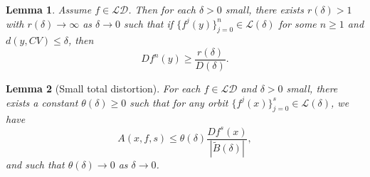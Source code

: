 \documentclass[11pt,oneside]{article}
\theoremstyle{plain}
\newtheorem{lem}{Lemma}[section]
\numberwithin{equation}{section}
\numberwithin{figure}{section}
\numberwithin{table}{section}
\begin{document}
\iffalse
\begin{lem}
Assume $f \in \mathcal {LD}$. Then for each $\delta >0$ small, there exists $r(\delta) > 1$ with $r(\delta) \to \infty$ as $\delta \to 0$ such that if $\{f^j(y) \}_{j=0}^n \in \mathcal L(\delta)$ for some $n \geq 1$ and $d (y, CV) \leq \delta$, then 
\[
Df^n(y) \geq \frac{r(\delta)}{D(\delta)}.
\]
\end{lem}

\begin{lem}[Small total distortion]
For each $f \in \mathcal {LD}$ and $\delta > 0$ small, there exists a constant $\theta(\delta) \geq 0$ such that for any orbit $\{ f^j(x)\}_{j=0}^s \in \mathcal L(\delta)$, we have
\begin{equation}
A(x, f, s)\leq \theta(\delta) \frac{Df^s (x)}{|\tilde B(\delta)|}, 
\end{equation}
and such that $\theta(\delta) \to 0$ as $\delta \to 0$.
\end{lem}
\end{document}

